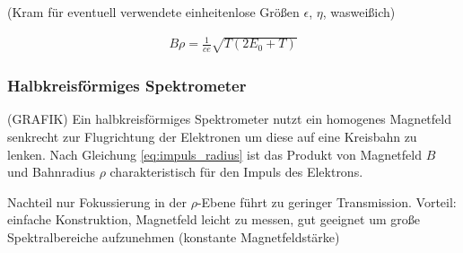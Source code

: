 \documentclass[11pt, a4paper]{article}
\numberwithin{equation}{section}
\begin{document}
(Kram für eventuell verwendete einheitenlose Größen $\epsilon$, $\eta$, wasweißich)

\begin{align}
	B \rho = \frac{1}{c e} \sqrt{T \left( 2 E_0 + T \right)}
	\label{eq:b_rho}
\end{align}

\subsubsection{Halbkreisförmiges Spektrometer}
(GRAFIK)
Ein halbkreisförmiges Spektrometer nutzt ein homogenes Magnetfeld senkrecht zur Flugrichtung der Elektronen um diese auf eine Kreisbahn zu lenken.
Nach Gleichung \eqref{eq:impuls_radius} ist das Produkt von Magnetfeld $B$ und Bahnradius $\rho$ charakteristisch für den Impuls des Elektrons.

Nachteil nur Fokussierung in der $\rho$-Ebene führt zu geringer Transmission.
Vorteil: einfache Konstruktion, Magnetfeld leicht zu messen, gut geeignet um große Spektralbereiche aufzunehmen (konstante Magnetfeldstärke)
\end{document}
